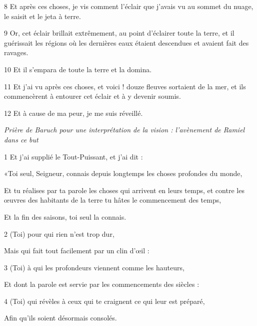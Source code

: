 \par 8 Et après ces choses, je vis comment l'éclair que j'avais vu au sommet du nuage, le saisit et le jeta à terre.

\par 9 Or, cet éclair brillait extrêmement, au point d'éclairer toute la terre, et il guérissait les régions où les dernières eaux étaient descendues et avaient fait des ravages.

\par 10 Et il s'empara de toute la terre et la domina.

\par 11 Et j'ai vu après ces choses, et voici ! douze fleuves sortaient de la mer, et ils commencèrent à entourer cet éclair et à y devenir soumis.

\par 12 Et à cause de ma peur, je me suis réveillé.


\par \textit{Prière de Baruch pour une interprétation de la vision : l'avènement de Ramiel dans ce but}


\par 1 Et j'ai supplié le Tout-Puissant, et j'ai dit :

\par «Toi seul, Seigneur, connais depuis longtemps les choses profondes du monde,

\par Et tu réalises par ta parole les choses qui arrivent en leurs temps, et contre les œuvres des habitants de la terre tu hâtes le commencement des temps,

\par Et la fin des saisons, toi seul la connais.

\par 2 (Toi) pour qui rien n'est trop dur,

\par Mais qui fait tout facilement par un clin d'œil :

\par 3 (Toi) à qui les profondeurs viennent comme les hauteurs,

\par Et dont la parole est servie par les commencements des siècles :

\par 4 (Toi) qui révèles à ceux qui te craignent ce qui leur est préparé,

\par Afin qu'ils soient désormais consolés.

